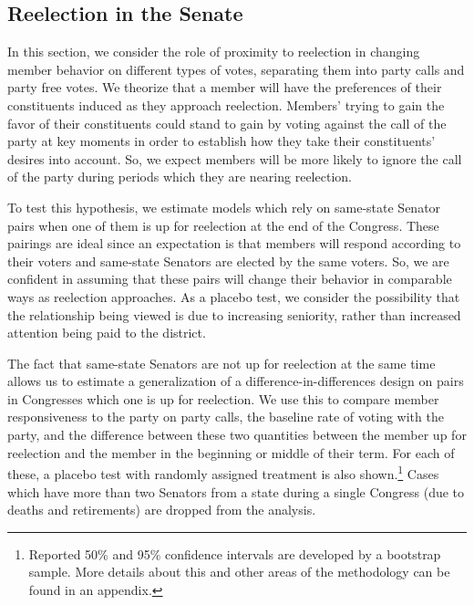 \documentclass[12pt]{article}
\begin{document}
\subsection{Reelection in the Senate}

In this section, we consider the role of proximity to reelection in changing member behavior on different types of votes, separating them into party calls and party free votes. We theorize that a member will have the preferences of their constituents induced as they approach reelection. Members' trying to gain the favor of their constituents could stand to gain by voting against the call of the party at key moments in order to establish how they take their constituents' desires into account. So, we expect members will be more likely to ignore the call of the party during periods which they are nearing reelection.

To test this hypothesis, we estimate models which rely on same-state Senator pairs when one of them is up for reelection at the end of the Congress. These pairings are ideal since an expectation is that members will respond according to their voters and same-state Senators are elected by the same voters. So, we are confident in assuming that these pairs will change their behavior in comparable ways as reelection approaches. As a placebo test, we consider the possibility that the relationship being viewed is due to increasing seniority, rather than increased attention being paid to the district.

The fact that same-state Senators are not up for reelection at the same time allows us to estimate a generalization of a difference-in-differences design on pairs in Congresses which one is up for reelection. We use this to compare member responsiveness to the party on party calls, the baseline rate of voting with the party, and the difference between these two quantities between the member up for reelection and the member in the beginning or middle of their term. For each of these, a placebo test with randomly assigned treatment is also shown.\footnote{Reported 50\% and 95\% confidence intervals are developed by a bootstrap sample. More details about this and other areas of the methodology can be found in an appendix.} Cases which have more than two Senators from a state during a single Congress (due to deaths and retirements) are dropped from the analysis.
\end{document}
